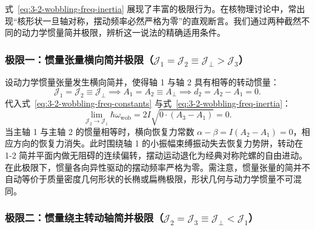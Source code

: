 式~\eqref{eq:3-2-wobbling-freq-inertia} 展现了丰富的极限行为。在核物理讨论中，常出现“核形状一旦轴对称，摆动频率必然严格为零”的直观断言。我们通过两种截然不同的动力学惯量简并极限，辨析这一说法的精确适用条件。

\subsubsection{极限一：惯量张量横向简并极限（$\mathcal{J}_1 = \mathcal{J}_2 \equiv \mathcal{J}_\perp > \mathcal{J}_3$）}

设动力学惯量张量发生横向简并，使得轴 1 与轴 2 具有相等的转动惯量：
\begin{equation}\label{eq:3-2-limit1-def}
\mathcal{J}_1 = \mathcal{J}_2 \equiv \mathcal{J}_\perp \implies A_1 = A_2 \equiv A_\perp \implies d_2 = A_2 - A_1 = 0.
\end{equation}
代入式~\eqref{eq:3-2-wobbling-freq-constants} 与式~\eqref{eq:3-2-wobbling-freq-inertia}：
\begin{equation}\label{eq:3-2-limit1-zero}
\lim_{\mathcal{J}_2 \to \mathcal{J}_1} \hbar \omega_{\text{wob}} = 2I \sqrt{0 \cdot (A_3 - A_1)} = 0.
\end{equation}
当主轴 1 与主轴 2 的惯量相等时，横向恢复力常数 $\alpha - \beta = I(A_2 - A_1) = 0$，相应方向的恢复力消失。此时围绕轴 1 的小振幅束缚振动失去恢复力势阱，转动在 1-2 简并平面内做无阻碍的连续偏转，摆动运动退化为经典对称陀螺的自由进动。在此极限下，惯量各向异性驱动的摆动频率严格为零。需注意，惯量张量的简并不自动等价于质量密度几何形状的长椭或扁椭极限，形状几何与动力学惯量不可混同。

\subsubsection{极限二：惯量绕主转动轴简并极限（$\mathcal{J}_2 = \mathcal{J}_3 \equiv \mathcal{J}_\perp < \mathcal{J}_1$）}

